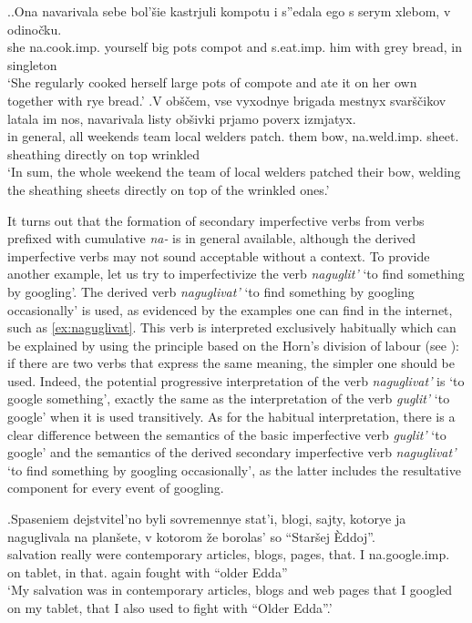 \ex.\ag.\label{ex:navarivat2}Ona navarivala sebe bol'\v{s}ie kastrjuli kompotu i s''edala ego s serym xlebom, v odino\v{c}ku.\\
she na.cook.imp. yourself big pots compot and s.eat.imp. him with grey bread, in singleton\\
\trans `She regularly cooked herself large pots of compote and ate it on her own together with rye bread.'
\bg.\label{ex:navarivat1}V ob\v{s}\v{c}em, vse vyxodnye brigada mestnyx svar\v{s}\v{c}ikov latala im nos, navarivala listy ob\v{s}ivki prjamo poverx izmjatyx.\\
in general, all weekends team local welders patch. them bow, na.weld.imp. sheet. sheathing directly {on top} wrinkled\\
\trans `In sum, the whole weekend the team of local welders patched their bow, welding the sheathing sheets directly on top of the wrinkled ones.'

It turns out that the formation of secondary imperfective verbs from verbs prefixed with cumulative \textit{na-} is in general available, although the derived imperfective verbs may not sound acceptable without a context. To provide another example, let us try to imperfectivize the verb \textit{naguglit'} `to find something by googling'. The derived verb \textit{naguglivat'} `to find something by googling occasionally' is used, as evidenced by the examples one can find in the internet, such as \ref{ex:naguglivat}. This verb is interpreted exclusively habitually which can be explained by using the principle based on the Horn's division of labour (see \citealt{Horn:84}): if there are two verbs that express the same meaning, the simpler one should be used. Indeed, the potential progressive interpretation of the verb \textit{naguglivat'} is `to google something', exactly the same as the interpretation of the verb \textit{guglit'} `to google' when it is used transitively. As for the habitual interpretation, there is a clear difference between the semantics of the basic imperfective verb \textit{guglit'} `to google' and the semantics of the derived secondary imperfective verb \textit{naguglivat'} `to find something by googling occasionally', as the latter includes the resultative component for every event of googling. 

\exg.\label{ex:naguglivat}Spaseniem dejstvitel'no byli sovremennye stat'i, blogi, sajty, kotorye ja naguglivala na plan\v{s}ete, v kotorom \v{z}e borolas' so ``Star\v{s}ej \`{E}ddoj''.\\
salvation really were contemporary articles, blogs, pages, that. I na.google.imp. on tablet, in that. again fought with ``older Edda''\\
\trans `My salvation was in contemporary articles, blogs and web pages that I googled on my tablet, that I also used to fight with ``Older Edda''.'\\

